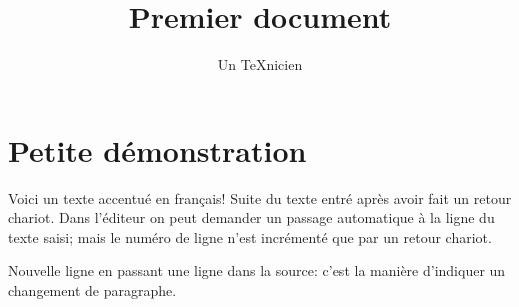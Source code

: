 \documentclass{article}
\title{Premier document}
\author{Un TeXnicien}
\date{}
\begin{document}
\maketitle
\tableofcontents

\section{Petite démonstration}

Voici un texte accentué en français!
Suite du texte entré après avoir fait un retour chariot. Dans
l'éditeur on peut demander un passage automatique à la ligne
du texte saisi; mais le numéro de ligne n'est incrémenté que par un
retour chariot.

Nouvelle ligne en passant une ligne dans la source: c'est la
manière d'indiquer un changement de paragraphe.
\end{document}
